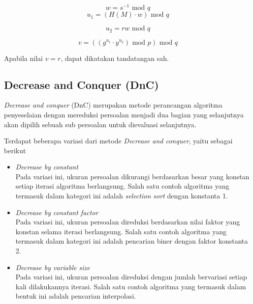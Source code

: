 \documentclass[10pt,conference]{IEEEtran}
\theoremstyle{definition}
\begin{document}
\begin{equation} \label{eq:dsa3} 
    w = s^{-1} \text{ mod } q
\end{equation}
\begin{equation} \label{eq:dsa4} 
    u_1 = (H(M) \cdot w) \text{ mod } q
\end{equation}

\begin{equation} \label{eq:dsa5} 
    u_2 = rw \text{ mod } q
\end{equation}

\begin{equation} \label{eq:dsa6} 
    v = ((g^{u_1} \cdot y^{u_2}) \text{ mod } p) \text{ mod } q
\end{equation}

Apabila nilai $v = r$, dapat dikatakan tandatangan sah.

\subsection{Decrease and Conquer (DnC)}

\emph{Decrease and conquer} (DnC) merupakan metode perancangan algoritma penyeselaian dengan mereduksi persoalan menjadi dua bagian yang selanjutnya akan dipilih sebuah sub persoalan untuk dievaluasi selanjutnya. \cite{ppt1}

Terdapat beberapa variasi dari metode \emph{Decrease and conquer}, yaitu sebagai berikut

\begin{itemize}
    \item \emph{Decrease by constant} \\
    Pada variasi ini, ukuran persoalan dikurangi berdasarkan besar yang konstan setiap iterasi algoritma berlangsung. Salah satu contoh algoritma yang termasuk dalam kategori ini adalah \emph{selection sort} dengan konstanta 1.
    \item \emph{Decrease by constant factor} \\
    Pada variasi ini, ukuran persoalan direduksi berdasarkan nilai faktor yang konstan selama iterasi berlangsung. Salah satu contoh algoritma yang termasuk dalam kategori ini adalah pencarian biner dengan faktor konstanta 2.
    \item \emph{Decrease by variable size} \\
    Pada variasi ini, ukuran persoalan direduksi dengan jumlah bervariasi setiap kali dilakukannya iterasi.  Salah satu contoh algoritma yang termasuk dalam bentuk ini adalah pencarian interpolasi.
\end{itemize}
\end{document}
